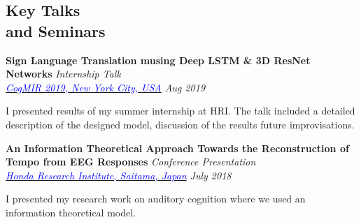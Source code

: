 \documentclass[margin,line, 9pt]{res}
\newenvironment{list1}{
  \begin{list}{\ding{113}}{%
      \setlength{\itemsep}{0in}
      \setlength{\parsep}{0in} \setlength{\parskip}{0in}
      \setlength{\topsep}{0in} \setlength{\partopsep}{0in} 
      \setlength{\leftmargin}{0.17in}}}{\end{list}}
\begin{document}
\begin{resume}
\section{\sc Key Talks \\ and Seminars}
% 
{\bf Sign Language Translation musing Deep LSTM \& 3D ResNet Networks} \hfill {\em Internship Talk} \\
{\em \href{http://www.jp.honda-ri.com/en/}{\textcolor{blue}{CogMIR 2019, New York City, USA}} \hfill Aug 2019} \\
\vspace*{-.15in}
\begin{list1}
\item[] I presented results of my summer internship at HRI. The talk included a detailed description of the designed model, discussion of the results future improvisations. 
\end{list1}
% 
{\bf An Information Theoretical Approach Towards the Reconstruction of Tempo from EEG Responses} \hfill {\em Conference Presentation} \\
{\em \href{http://www.jp.honda-ri.com/en/}{\textcolor{blue}{Honda Research Institute, Saitama, Japan}} \hfill July 2018} \\
\vspace*{-.15in}
\begin{list1}
\item[] I presented my research work on auditory cognition where we used an information theoretical model.
\end{list1}
% 
\vspace*{-0.1in}
% 
% 


\end{resume}
\end{document}
